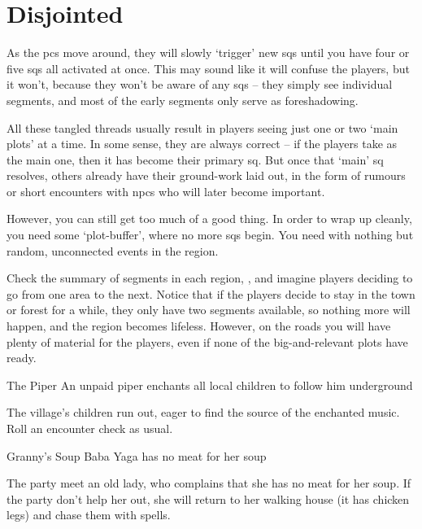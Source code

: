 \section{Disjointed }

\begin{multicols}{2}

\noindent
As the \glspl{pc} move around, they will slowly `trigger' new \glspl{sq} until you have four or five \glspl{sq} all activated at once.
This may sound like it will confuse the players, but it won't, because they won't be aware of any \glspl{sq} -- they simply see individual \glspl{segment}, and most of the early \glspl{segment} only serve as foreshadowing.

All these tangled threads usually result in players seeing just one or two `main plots' at a time.
In some sense, they are always correct -- if the players take  as the main one, then it has become their primary \gls{sq}.
But once that `main' \gls{sq} resolves, others already have their ground-work laid out, in the form of rumours or short encounters with \glspl{npc} who will later become important.

However, you can still get too much of a good thing.
In order to wrap up  cleanly, you need some `plot-buffer', where no more \glspl{sq} begin.
You need  with nothing but random, unconnected events in the \gls{region}.

Check the summary of \glspl{segment} in each \gls{region}, , and imagine players deciding to go from one area to the next.
Notice that if the players decide to stay in the town or forest for a while, they only have two \glspl{segment} available, so nothing more will happen, and the \gls{region} becomes lifeless.
However, on the roads you will have plenty of material for the players, even if none of the big-and-relevant plots have  ready.


{The Piper}%
{An unpaid piper enchants all local children to follow him underground}%

The \gls{village}'s children run out, eager to find the source of the enchanted music.
Roll an encounter check as usual.

{Granny's Soup}%
{Baba Yaga has no meat for her soup}%

The party meet an old lady, who complains that she has no meat for her soup.
If the party don't help her out, she will return to her walking house (it has chicken legs) and chase them with spells.


\end{multicols}
